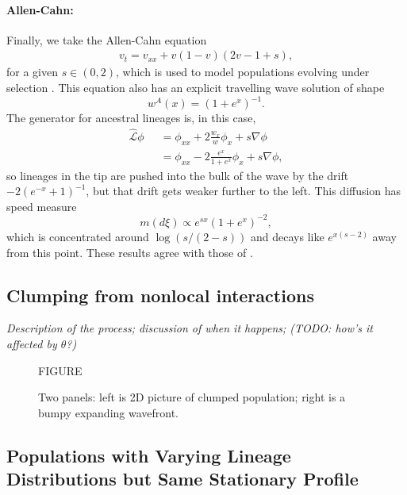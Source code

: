 \documentclass[12pt]{article}
\def \hat{\widehat}
\newcommand{\comment}[1]{{\color{blue} \it #1}}
\begin{document}
\paragraph{Allen-Cahn:}
Finally, we take the Allen-Cahn equation
\begin{align} \label{eqn:allen_cahn}
    v_t = v_{xx} + v(1-v)(2v-1+s),
\end{align}
for a given $s \in (0,2)$,
which is used to model populations evolving under selection \cite{Sarah}.
This equation also has an explicit travelling wave solution
of shape
\[ w^A(x) = (1+e^{x})^{-1}. \]
The generator for ancestral lineages is, in this case,
\begin{align*}
    \hat{\mathcal{L}}\phi
    &=
    \phi_{xx}
    + 
    2 \frac{w_x}{w} \phi_x
    +
    s \nabla \phi \\
    \qquad &=
    \phi_{xx}
    -
    2 \frac{e^x}{1+e^x} \phi_x 
    + 
    s \nabla \phi,
\end{align*}
so lineages in the tip are pushed into the bulk of the wave by the drift $-2(e^{-x}+1)^{-1}$,
but that drift gets weaker further to the left.
This diffusion has speed measure
$$
    m(d\xi) \propto e^{sx}(1+e^x)^{-2},
$$
which is concentrated around $\log(s/(2-s))$ and decays like $e^{x(s-2)}$ away from this point.
These results agree with those of \cite{etheridge/penington:2020}.


\subsection{Clumping from nonlocal interactions}

\comment{
    Description of the process;
    discussion of when it happens;
    (TODO: how's it affected by $\theta$?)
}

\begin{figure}
    \begin{center}
        FIGURE
    \end{center}
    \caption{
        Two panels: left is 2D picture of clumped population;
        right is a bumpy expanding wavefront.
        \label{fig:clumping}
    }
\end{figure}

\subsection{Populations with Varying Lineage Distributions but Same Stationary Profile}
\end{document}
